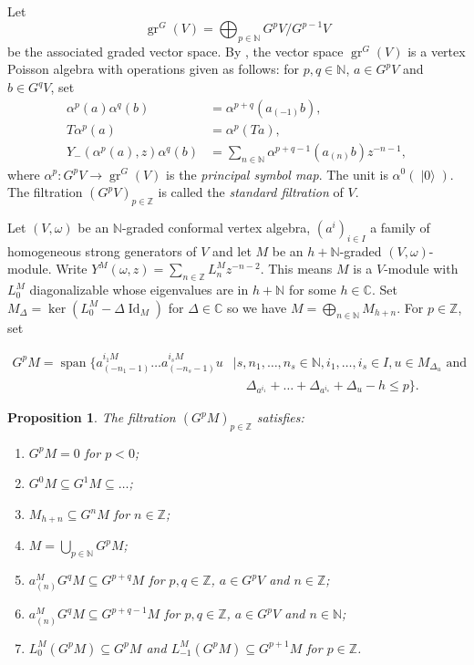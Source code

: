 \documentclass[a4paper, 12pt, reqno]{amsart}
\newtheorem{proposition}[theorem]{Proposition}
\theoremstyle{remark}
\DeclareMathOperator{\Id}{Id}
\DeclareMathOperator{\gr}{gr}
\DeclareMathOperator{\vspan}{span}
\DeclareMathOperator{\vac}{|0\rangle}
\begin{document}
Let
\begin{equation*}
  \gr^G(V) = \bigoplus_{p \in \mathbb{N}}G^pV/G^{p - 1}V
\end{equation*}
be the associated graded vector space.
By \cite{li_vertex_2004}, the vector space $\gr^G(V)$ is a vertex Poisson algebra with operations given as follows: for $p, q \in \mathbb{N}$, $a \in G^pV$ and $b \in G^qV$, set
\begin{align*}
  \alpha^p(a)\alpha^q(b) &= \alpha^{p + q}(a_{(-1)}b), \\
  T\alpha^p(a) &= \alpha^p(Ta), \\
  Y_-(\alpha^p(a), z)\alpha^q(b) &= \sum_{n \in \mathbb{N}}\alpha^{p + q - 1}(a_{(n)}b)z^{-n - 1},
\end{align*}
where $\alpha^p: G^pV \to \gr^G(V)$ is the \emph{principal symbol map}.
The unit is $\alpha^0(\vac)$.
The filtration $(G^pV)_{p \in \mathbb{Z}}$ is called the \emph{standard filtration} of $V$.

Let $(V, \omega)$ be an $\mathbb{N}$-graded conformal vertex algebra, $(a^i)_{i \in I}$ a family of homogeneous strong generators of $V$ and let $M$ be an $h + \mathbb{N}$-graded $(V, \omega)$-module.
Write $Y^M(\omega, z) = \sum_{n \in \mathbb{Z}}L^M_nz^{-n - 2}$.
This means $M$ is a $V$-module with $L_0^M$ diagonalizable whose eigenvalues are in $h + \mathbb{N}$ for some $h \in \mathbb{C}$.
Set $M_{\Delta} = \ker(L^M_0 - \Delta\Id_M)$ for $\Delta \in \mathbb{C}$ so we have $M = \bigoplus_{n \in \mathbb{N}}M_{h + n}$.
For $p \in \mathbb{Z}$, set

\begin{equation*}
  \begin{split}
    G^pM = \vspan\{a^{i_1M}_{(-n_1 - 1)}\dots a^{i_sM}_{(-n_s - 1)}u &\mid s, n_1, \dots, n_s \in \mathbb{N}, i_1, \dots, i_s \in I, u \in M_{\Delta_u} \text{ and }\\
    &\quad \Delta_{a^{i_1}} + \dots + \Delta_{a^{i_s}} + \Delta_u - h \le p\}.
  \end{split}
\end{equation*}

\begin{proposition}
  \label{prp:2}
  The filtration $(G^pM)_{p \in \mathbb{Z}}$ satisfies:
  \begin{enumerate}
  \item $G^pM = 0$ for $p < 0$;
  \item $G^0M \subseteq G^1M \subseteq \dots$;
  \item $M_{h + n} \subseteq G^nM$ for $n \in \mathbb{Z}$;
  \item $M = \bigcup_{p \in \mathbb{N}}G^pM$;
  \item $a^M_{(n)}G^qM \subseteq G^{p + q}M$ for $p, q \in \mathbb{Z}$, $a \in G^pV$ and $n \in \mathbb{Z}$;
  \item $a^M_{(n)}G^qM \subseteq G^{p + q - 1}M$ for $p, q \in \mathbb{Z}$, $a \in G^pV$ and $n \in \mathbb{N}$;
  \item $L^M_0(G^pM) \subseteq G^pM$ and $L^M_{-1}(G^pM) \subseteq G^{p + 1}M$ for $p \in \mathbb{Z}$.
  \end{enumerate}
\end{proposition}
\end{document}

